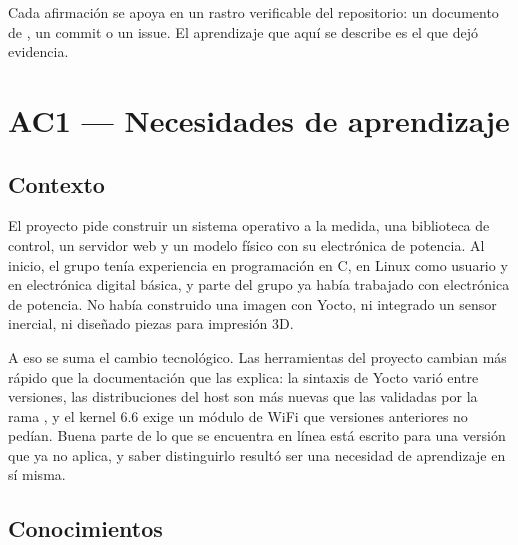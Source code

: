\documentclass[11pt,a4paper]{article}
\newcommand{\id}[1]{\texttt{\detokenize{#1}}}
\begin{document}
Cada afirmación se apoya en un rastro verificable del repositorio: un
documento de \id{docs/}, un commit o un issue. El aprendizaje que aquí se
describe es el que dejó evidencia.

\section{AC1 --- Necesidades de aprendizaje}

\subsection{Contexto}

El proyecto pide construir un sistema operativo a la medida, una biblioteca
de control, un servidor web y un modelo físico con su electrónica de
potencia. Al inicio, el grupo tenía experiencia en programación en C, en
Linux como usuario y en electrónica digital básica, y parte del grupo ya
había trabajado con electrónica de potencia. No había construido una imagen
con Yocto, ni integrado un sensor inercial, ni diseñado piezas para
impresión 3D.

A eso se suma el cambio tecnológico. Las herramientas del proyecto cambian
más rápido que la documentación que las explica: la sintaxis de Yocto varió
entre versiones, las distribuciones del host son más nuevas que las validadas
por la rama \id{scarthgap}, y el kernel 6.6 exige un módulo de WiFi que
versiones anteriores no pedían. Buena parte de lo que se encuentra en línea
está escrito para una versión que ya no aplica, y saber distinguirlo resultó
ser una necesidad de aprendizaje en sí misma.

\subsection{Conocimientos}
\end{document}
